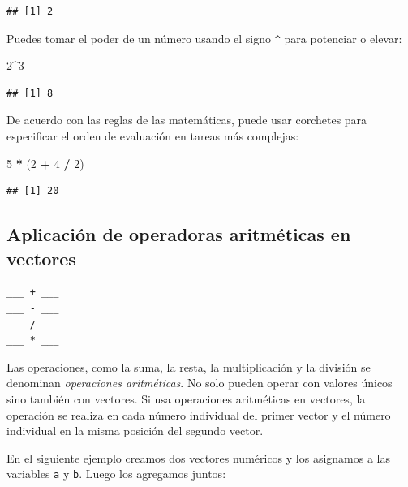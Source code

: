 \documentclass[
]{book}
\newenvironment{Shaded}{\begin{snugshade}}{\end{snugshade}}
\newcommand{\DecValTok}[1]{\textcolor[rgb]{0.00,0.00,0.81}{#1}}
\newcommand{\NormalTok}[1]{#1}
\newcommand{\OperatorTok}[1]{\textcolor[rgb]{0.81,0.36,0.00}{\textbf{#1}}}
\newcommand{\StringTok}[1]{\textcolor[rgb]{0.31,0.60,0.02}{#1}}
\begin{document}
\begin{verbatim}
## [1] 2
\end{verbatim}

Puedes tomar el poder de un número usando el signo \texttt{\^{}} para potenciar o elevar:

\begin{Shaded}
\begin{Highlighting}[]
\DecValTok{2}\OperatorTok{^}\DecValTok{3}
\end{Highlighting}
\end{Shaded}

\begin{verbatim}
## [1] 8
\end{verbatim}

De acuerdo con las reglas de las matemáticas, puede usar corchetes para especificar el orden de evaluación en tareas más complejas:

\begin{Shaded}
\begin{Highlighting}[]
\DecValTok{5} \OperatorTok{*}\StringTok{ }\NormalTok{(}\DecValTok{2} \OperatorTok{+}\StringTok{ }\DecValTok{4} \OperatorTok{/}\StringTok{ }\DecValTok{2}\NormalTok{)}
\end{Highlighting}
\end{Shaded}

\begin{verbatim}
## [1] 20
\end{verbatim}

\hypertarget{aplicaciuxf3n-de-operadoras-aritmuxe9ticas-en-vectores}{%
\subsection{Aplicación de operadoras aritméticas en vectores}\label{aplicaciuxf3n-de-operadoras-aritmuxe9ticas-en-vectores}}

\begin{verbatim}
___ + ___
___ - ___
___ / ___
___ * ___
\end{verbatim}

Las operaciones, como la suma, la resta, la multiplicación y la división se denominan \emph{operaciones aritméticas}. No solo pueden operar con valores únicos sino también con vectores. Si usa operaciones aritméticas en vectores, la operación se realiza en cada número individual del primer vector y el número individual en la misma posición del segundo vector.

En el siguiente ejemplo creamos dos vectores numéricos y los asignamos a las variables \texttt{a} y \texttt{b}. Luego los agregamos juntos:
\end{document}
